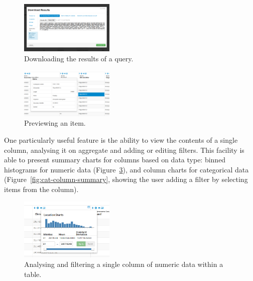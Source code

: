 \documentclass[10pt,a4paper,twocolumn]{article}
\begin{document}
\begin{figure}[htb]
\centering
\includegraphics[width=0.4\textwidth]{table-download.png}
\caption{\label{fig:export} Downloading the results of a query.}
\end{figure}

\begin{figure}[htb]
\centering
\includegraphics[width=0.4\textwidth]{preview-gene.png}
\caption{\label{fig:preview} Previewing an item.}
\end{figure}

One particularly useful feature is the ability to view the contents of a
single column, analysing it on aggregate and adding or editing filters. This
facility is able to present summary charts for columns based on data type:
binned histograms for numeric data (Figure~\ref{fig:column-summary}), and
column charts for categorical data (Figure~\ref{fig:cat-column-summary},
showing the user adding a filter by selecting items from the column).

\begin{figure}[t]
\centering
\includegraphics[width=0.4\textwidth]{im-tables-column-summary.png}
\caption{
    \label{fig:column-summary}
    Analysing and filtering a single column of numeric data within a table.
}
\end{figure}
\end{document}
